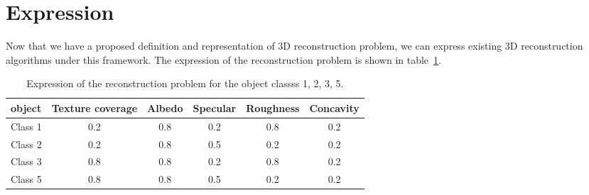 
\section{Expression}
\label{sec:3DRecon_Exp}
Now that we have a proposed definition and representation of 3D reconstruction problem, we can express existing 3D reconstruction algorithms under this framework. The expression of the reconstruction problem is shown in table~\ref{tab:express}.
\begin{table}[h]
  \centering
  \begin{tabular}{l*{5}{c}}
  \hline
  \textbf{object} & Texture coverage & Albedo & Specular & Roughness & Concavity\\
  \hline
  Class 1 & 0.2 & 0.8 & 0.2 & 0.8 & 0.2\\
  Class 2 & 0.2 & 0.8 & 0.5 & 0.2 & 0.2\\
  Class 3 & 0.8 & 0.8 & 0.2 & 0.8 & 0.2\\
  Class 5 & 0.8 & 0.8 & 0.5 & 0.2 & 0.2\\
  \hline
  \end{tabular}
  \caption{Expression of the reconstruction problem for the object classss 1, 2, 3, 5.}
  \label{tab:express}
\end{table}